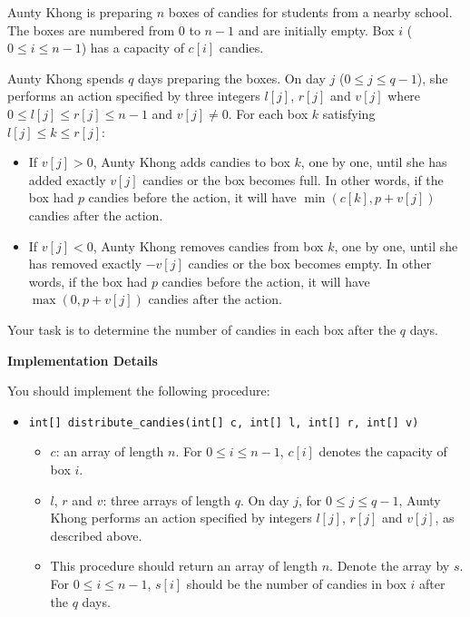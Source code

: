 Aunty Khong is preparing $n$ boxes of candies for students from a nearby school. The boxes are numbered from $0$ to $n-1$ and are initially empty. Box $i$ ($0 \leq i \leq n-1$) has a capacity of $c[i]$ candies.

Aunty Khong spends $q$ days preparing the boxes. On day $j$ ($0 \leq j \leq q-1$), she performs an action specified by three integers $l[j]$, $r[j]$ and $v[j]$ where $0 \leq l[j] \leq r[j] \leq n-1$ and $v[j] \neq 0$. For each box $k$ satisfying $l[j] \leq k \leq r[j]$:
\begin{itemize}
\item If $v[j] > 0$, Aunty Khong adds candies to box $k$, one by one, until she has added exactly $v[j]$ candies or the box becomes full. In other words, if the box had $p$ candies before the action, it will have $\min(c[k],p+v[j])$ candies after the action.
\item If $v[j] < 0$, Aunty Khong removes candies from box $k$, one by one, until she has removed exactly $-v[j]$ candies or the box becomes empty. In other words, if the box had $p$ candies before the action, it will have $\max(0,p+v[j])$ candies after the action.
\end{itemize}

Your task is to determine the number of candies in each box after the $q$ days.


\textbf{Implementation Details}

You should implement the following procedure:
\begin{itemize}
\item \texttt{int[] distribute\_candies(int[] c, int[] l, int[] r, int[] v)}
\begin{itemize}
\item $c$: an array of length $n$. For $0 \leq i \leq n-1$, $c[i]$ denotes the capacity of box $i$.
\item $l$, $r$ and $v$: three arrays of length $q$. On day $j$, for $0 \leq j \leq q-1$, Aunty Khong performs an action specified by integers $l[j]$, $r[j]$ and $v[j]$, as described above.
\item This procedure should return an array of length $n$. Denote the array by $s$. For $0 \leq i \leq n-1$, $s[i]$ should be the number of candies in box $i$ after the $q$ days.
\end{itemize}
\end{itemize}
